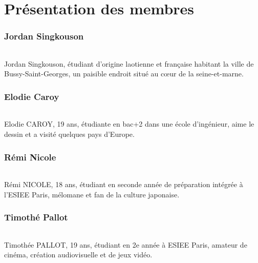 \part{Présentation des membres}
\section{Jordan Singkouson}
\paragraph{}
Jordan Singkouson, étudiant d’origine laotienne et française habitant la ville de Bussy-Saint-Georges, un paisible endroit situé au cœur de la seine-et-marne. 

\section{Elodie Caroy}
\paragraph{}
Elodie CAROY, 19 ans, étudiante en bac+2 dans une école d’ingénieur, aime le dessin et a visité quelques pays d’Europe.

\section{Rémi Nicole}
\paragraph{}
Rémi NICOLE, 18 ans, étudiant en seconde année de préparation intégrée à l’ESIEE Paris, mélomane et fan de la culture japonaise.

\section{Timothé Pallot}
\paragraph{}
Timothée PALLOT, 19 ans, étudiant en 2e année à ESIEE Paris, amateur de cinéma, création audiovisuelle et de jeux vidéo.
